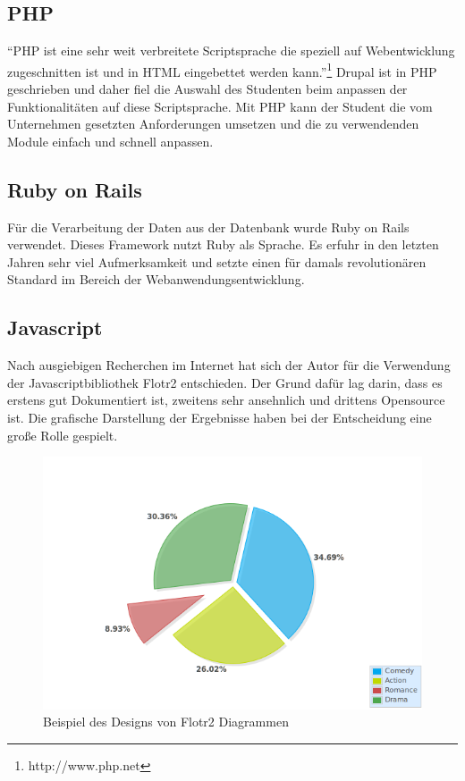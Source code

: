 \subsection{PHP}
``PHP ist eine sehr weit verbreitete Scriptsprache die speziell auf Webentwicklung zugeschnitten ist und in HTML eingebettet werden kann.''\footnote{http://www.php.net}
Drupal ist in PHP geschrieben und daher fiel die Auswahl des Studenten beim anpassen der Funktionalitäten auf diese Scriptsprache. Mit PHP kann der Student die vom Unternehmen gesetzten Anforderungen umsetzen und die zu verwendenden Module einfach und schnell anpassen.
\subsection{Ruby on Rails}
Für die Verarbeitung der Daten aus der Datenbank wurde Ruby on Rails verwendet. 
Dieses Framework nutzt Ruby als Sprache. Es erfuhr in den letzten Jahren sehr viel Aufmerksamkeit und setzte einen für damals revolutionären Standard im Bereich der Webanwendungsentwicklung.\citep{graver}
\subsection{Javascript}
Nach ausgiebigen Recherchen im Internet hat sich der Autor für die Verwendung der Javascriptbibliothek Flotr2 entschieden. Der Grund dafür lag darin, dass es erstens gut Dokumentiert ist, zweitens sehr ansehnlich und drittens Opensource ist. Die grafische Darstellung der Ergebnisse haben bei der Entscheidung eine große Rolle gespielt.
\begin{figure}[htbp]
 \centering
 \includegraphics{./material/pie_chart.png}
 \caption{Beispiel des Designs von Flotr2 Diagrammen}
 \label{fig:pie_chart_flotr}
\end{figure}

